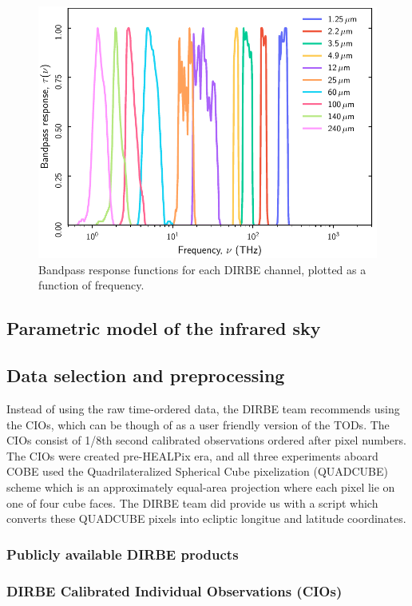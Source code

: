 \documentclass{aa}
\begin{document}
\begin{figure}
  \centering
  \includegraphics[width=\linewidth]{figs/DIRBE_bp.pdf}
  \caption{Bandpass response functions for each DIRBE channel, plotted as a function of frequency.}
  \label{fig:bandpass}
\end{figure}



\subsection{Parametric model of the infrared sky}

\subsection{Data selection and preprocessing}
Instead of using the raw time-ordered data, the DIRBE team recommends using the CIOs, which can be though of as a user friendly version of the TODs. The CIOs consist of 1/8th second calibrated observations ordered after pixel numbers. The CIOs were created pre-HEALPix era, and all three experiments aboard COBE used the Quadrilateralized Spherical Cube pixelization (QUADCUBE) scheme which is an approximately equal-area projection where each pixel lie on one of four cube faces. The DIRBE team did provide us with a script which converts these QUADCUBE pixels into ecliptic longitue and latitude coordinates.
\subsubsection{Publicly available DIRBE products}
\subsubsection{DIRBE Calibrated Individual Observations (CIOs)}
\end{document}
